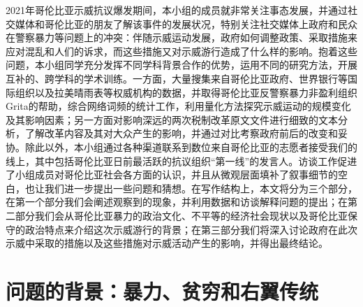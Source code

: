 \documentclass{phyasgn}\usepackage{nag}
\begin{document}
\par 2021年哥伦比亚示威抗议爆发期间，本小组的成员就非常关注事态发展，并通过社交媒体和哥伦比亚的朋友了解该事件的发展状况，特别关注社交媒体上政府和民众在警察暴力等问题上的冲突：伴随示威运动发展，政府如何调整政策、采取措施来应对混乱和人们的诉求，而这些措施又对示威游行造成了什么样的影响。抱着这些问题，本小组同学充分发挥不同学科背景合作的优势，运用不同的研究方法，开展互补的、跨学科的学术训练。一方面，大量搜集来自哥伦比亚政府、世界银行等国际组织以及拉美晴雨表等权威机构的数据，并取得哥伦比亚反警察暴力非盈利组织Grita的帮助，综合网络词频的统计工作，利用量化方法探究示威运动的规模变化及其影响因素；另一方面对影响深远的两次税制改革原文文件进行细致的文本分析，了解改革内容及其对大众产生的影响，并通过对比考察政府前后的改变和妥协。除此以外，本小组通过各种渠道联系到数位来自哥伦比亚的志愿者接受我们的线上，其中包括哥伦比亚日前最活跃的抗议组织“第一线”的发言人。访谈工作促进了小组成员对哥伦比亚社会各方面的认识，并且从微观层面填补了叙事细节的空白，也让我们进一步提出一些问题和猜想。在写作结构上，本文将分为三个部分，在第一个部分我们会阐述观察到的现象，并利用数据和访谈解释问题的提出；在第二部分我们会从哥伦比亚暴力的政治文化、不平等的经济社会现状以及哥伦比亚保守的政治特点来介绍这次示威游行的背景；在第三部分我们将深入讨论政府在此次示威中采取的措施以及这些措施对示威活动产生的影响，并得出最终结论。
\section{问题的背景：暴力、贫穷和右翼传统}
\end{document}
